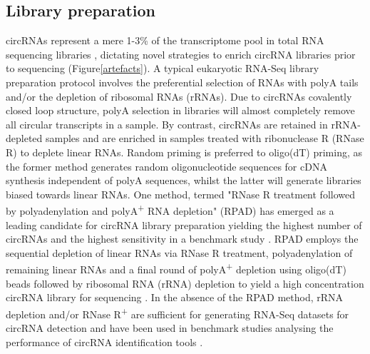 \documentclass[journal,review,submit,pdftex,moreauthors]{Definitions/mdpi}
\begin{document}
\subsection{Library preparation}
circRNAs represent a mere 1-3\% of the transcriptome pool in total RNA sequencing libraries \cite{Guria2022May}, dictating novel strategies to enrich circRNA libraries prior to sequencing (Figure\ref{artefacts}). A typical eukaryotic RNA-Seq library preparation protocol involves the preferential selection of RNAs with polyA tails and/or the depletion of ribosomal RNAs (rRNAs). Due to circRNAs covalently closed loop structure, polyA selection in libraries will almost completely remove all circular transcripts in a sample. By contrast, circRNAs are retained in rRNA-depleted samples and are enriched in samples treated with ribonuclease R (RNase R) to deplete linear RNAs. Random priming is preferred to oligo(dT) priming, as the former method generates random oligonucleotide sequences for cDNA synthesis independent of polyA sequences, whilst the latter will generate libraries biased towards linear RNAs. One method, termed "RNase R treatment followed by polyadenylation and polyA\textsuperscript{+} RNA depletion" (RPAD) has emerged as a leading candidate for circRNA library preparation yielding the highest number of circRNAs and the highest sensitivity in a benchmark study \cite{Shi2022Dec}. RPAD employs the sequential depletion of linear RNAs via RNase R treatment, polyadenylation of remaining linear RNAs and a final round of polyA\textsuperscript{+} depletion using oligo(dT) beads followed by ribosomal RNA (rRNA) depletion to yield a high concentration circRNA library for sequencing \cite{Panda2017Jul, Pandey2019Feb}. In the absence of the RPAD method, rRNA depletion and/or RNase R\textsuperscript{+} are sufficient for generating RNA-Seq datasets for circRNA detection and have been used in benchmark studies analysing the performance of circRNA identification tools \cite{DCC}.
\end{document}
